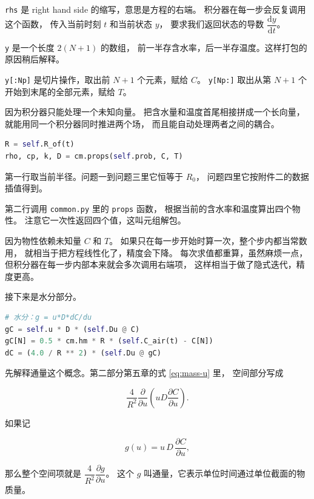 \texttt{rhs} 是 right hand side 的缩写，意思是方程的右端。
积分器在每一步会反复调用这个函数，
传入当前时刻 $t$ 和当前状态 $y$，
要求我们返回状态的导数 $\dfrac{\mathrm{d}y}{\mathrm{d}t}$。

\texttt{y} 是一个长度 $2(N+1)$ 的数组，
前一半存含水率，后一半存温度。这样打包的原因稍后解释。

\texttt{y[:Np]} 是切片操作，取出前 $N+1$ 个元素，赋给 $C$。
\texttt{y[Np:]} 取出从第 $N+1$ 个开始到末尾的全部元素，赋给 $T$。

因为积分器只能处理一个未知向量。
把含水量和温度首尾相接拼成一个长向量，
就能用同一个积分器同时推进两个场，
而且能自动处理两者之间的耦合。

\begin{lstlisting}[language=Python]
R = self.R_of(t)
rho, cp, k, D = cm.props(self.prob, C, T)
\end{lstlisting}

第一行取当前半径。问题一到问题三里它恒等于 $R_0$，
问题四里它按附件二的数据插值得到。

第二行调用 \texttt{common.py} 里的 \texttt{props} 函数，
根据当前的含水率和温度算出四个物性。
注意它一次性返回四个值，这叫元组解包。

因为物性依赖未知量 $C$ 和 $T$。
如果只在每一步开始时算一次，整个步内都当常数用，
就相当于把方程线性化了，精度会下降。
每次求值都重算，虽然麻烦一点，
但积分器在每一步内部本来就会多次调用右端项，
这样相当于做了隐式迭代，精度更高。

接下来是水分部分。

\begin{lstlisting}[language=Python]
# 水分：g = u*D*dC/du
gC = self.u * D * (self.Du @ C)
gC[N] = 0.5 * cm.hm * R * (self.C_air(t) - C[N])
dC = (4.0 / R ** 2) * (self.Du @ gC)
\end{lstlisting}

先解释通量这个概念。第二部分第五章的式 \eqref{eq:mass-u} 里，
空间部分写成

\begin{equation}
\frac{4}{R^2}\frac{\partial}{\partial u}\left(uD\frac{\partial C}{\partial u}\right).
\end{equation}

如果记

\begin{equation}
g(u) = u\,D\,\frac{\partial C}{\partial u},
\label{eq:fluxdef}
\end{equation}

那么整个空间项就是 $\dfrac{4}{R^2}\dfrac{\partial g}{\partial u}$。
这个 $g$ 叫通量，它表示单位时间通过单位截面的物质量。

